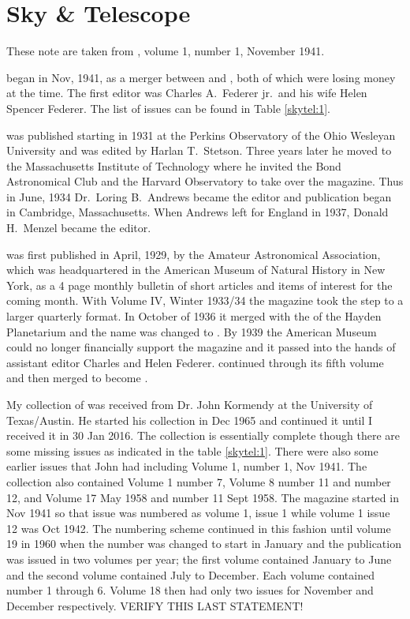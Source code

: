 \section{Sky \& Telescope}

These note are taken from , volume 1, number 1,
November 1941.

 began in Nov, 1941, as a merger between  and , both of which were losing money at the
time.  The first editor was Charles A.~Federer jr.\ and his wife Helen
Spencer Federer. The list of issues can be found in Table \ref{skytel:1}.

 was published starting in 1931 at
the Perkins Observatory of the Ohio Wesleyan University and was edited
by Harlan T.~Stetson. Three years later he moved to the Massachusetts
Institute of Technology where he invited the Bond Astronomical Club and
the Harvard Observatory to take over the magazine. Thus in June, 1934
Dr.~Loring B.~Andrews became the editor and publication began in Cambridge,
Massachusetts.  When Andrews left for England in 1937, Donald H.~Menzel
became the editor.

 was first published in April, 1929, by the
Amateur Astronomical Association, which was headquartered in the American
Museum of Natural History in New York, as a 4 page monthly bulletin of
short articles and items of interest for the coming month.  With
Volume IV, Winter 1933/34 the magazine took the step to a larger
quarterly format.  In October of 1936 it merged with the  of the Hayden Planetarium and the name was changed to
. By 1939 the American Museum could no longer financially
support the magazine and it passed into the hands of assistant
editor Charles and Helen Federer.  continued through
its fifth volume and then merged to become .

My collection of  was received from Dr. John
Kormendy at the University of Texas/Austin. He started his collection
in Dec 1965 and continued it until I received it in 30 Jan 2016.  The
collection is essentially complete though there are some missing
issues as indicated in the table \ref{skytel:1}. There were also some
earlier issues that John had including Volume 1, number 1, Nov 1941.
The collection also contained Volume 1 number 7, Volume 8 number 11
and number 12, and Volume 17 May 1958 and number 11 Sept 1958.  The
magazine started in Nov 1941 so that issue was numbered as volume 1,
issue 1 while volume 1 issue 12 was Oct 1942.  The numbering scheme
continued in this fashion until volume 19 in 1960 when the number was
changed to start in January and the publication was issued in two
volumes per year; the first volume contained January to June and the
second volume contained July to December. Each volume contained number
1 through 6.  Volume 18 then had only two issues for November and
December respectively.  VERIFY THIS LAST STATEMENT!

